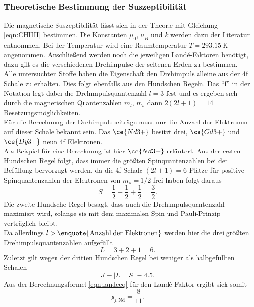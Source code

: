 \subsubsection{Theoretische Bestimmung der Suszeptibilität}

Die magnetische Suszeptibilität lässt sich in der Theorie mit Gleichung \eqref{eqn:CHIIII} bestimmen. Die Konstanten $\mu_0$, $\mu_B$ und $k$ werden dazu der Literatur \cite{lit2} entnommen.
Bei der Temperatur wird eine Raumtemperatur $T = \SI{293.15}{\kelvin}$ angenommen.
Anschließend werden noch die jeweiligen Landé-Faktoren benötigt, dazu gilt es die verschiedenen Drehimpulse der seltenen Erden zu bestimmen. Alle untersuchten Stoffe haben die Eigenschaft
den Drehimpuls alleine aus der 4f Schale zu erhalten. Dies folgt ebenfalls aus den Hundschen Regeln. Das \enquote{f} in der Notation legt dabei die Drehimpulsquantenzahl $l = 3$ fest und es ergeben sich
durch die magnetischen Quantenzahlen $m_l$, $m_s$ dann $2(2l+1) = 14$ Besetzungsmöglichkeiten. 
\\
Für die Berechnung der Drehimpulsbeiträge muss nur die Anzahl der Elektronen auf dieser Schale bekannt sein. Das $\ce{Nd3+}$ besitzt drei, $\ce{Gd3+}$ und $\ce{Dy3+}$ neun 4f Elektronen.
\\
Als Beispiel für eine Berechnung ist hier $\ce{Nd3+}$ erläutert.
Aus der ersten Hundschen Regel folgt, dass immer die größten Spinquantenzahlen bei der Befüllung bervorzugt werden, da die 4f Schale $(2l+1) = 6$ Plätze für positive Spinquantenzahlen der Elektronen
von $m_s = 1$/$2$ frei haben folgt daraus
\begin{equation*}
S = \frac{1}{2} + \frac{1}{2} + \frac{1}{2} =  \frac{3}{2}.
\end{equation*}
Die zweite Hundsche Regel besagt, dass auch die Drehimpulsquantenzahl maximiert wird, solange sie mit dem maximalen Spin und Pauli-Prinzip verträglich bleibt. 
\\
Da allerdings $l > \text{\enquote{Anzahl der Elektronen}}$
werden hier die drei größten Drehimpulsquantenzahlen aufgefüllt
\begin{equation*}
    L = 3 + 2 + 1 =  6.
\end{equation*}
Zuletzt gilt wegen der dritten Hundschen Regel bei weniger als halbgefüllten Schalen
\begin{equation*}
    J = |L - S| = 4.5.
\end{equation*}
Aus der Berechnungsformel \eqref{eqn:landeeq} für den Landé-Faktor ergibt sich somit
\begin{equation*}
g_{j,\text{Nd}} = \frac{8}{11}.
\end{equation*}
